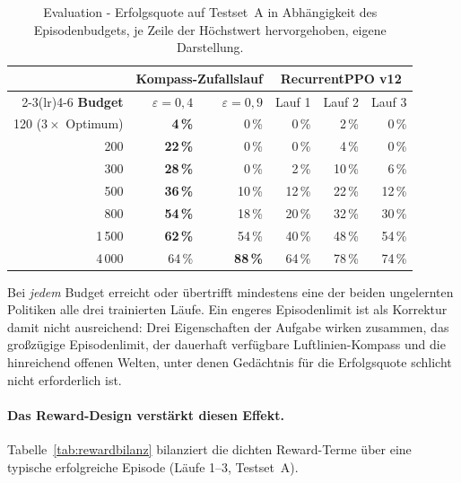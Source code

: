 \documentclass[11pt,a4paper]{article}
\begin{document}
\begin{table}[h]
\centering
\small
\begin{tabular}{@{}rrrrrr@{}}
\toprule
& \multicolumn{2}{c}{\textbf{Kompass-Zufallslauf}} & \multicolumn{3}{c}{\textbf{RecurrentPPO v12}} \\
\cmidrule(lr){2-3}\cmidrule(lr){4-6}
\textbf{Budget} & $\varepsilon = 0{,}4$ & $\varepsilon = 0{,}9$ & Lauf 1 & Lauf 2 & Lauf 3 \\
\midrule
120 ($3\times$ Optimum) & \textbf{4\,\%}  & 0\,\%  & 0\,\%  & 2\,\%  & 0\,\% \\
200                     & \textbf{22\,\%} & 0\,\%  & 0\,\%  & 4\,\%  & 0\,\% \\
300                     & \textbf{28\,\%} & 0\,\%  & 2\,\%  & 10\,\% & 6\,\% \\
500                     & \textbf{36\,\%} & 10\,\% & 12\,\% & 22\,\% & 12\,\% \\
800                     & \textbf{54\,\%} & 18\,\% & 20\,\% & 32\,\% & 30\,\% \\
1\,500                  & \textbf{62\,\%} & 54\,\% & 40\,\% & 48\,\% & 54\,\% \\
4\,000                  & 64\,\%          & \textbf{88\,\%} & 64\,\% & 78\,\% & 74\,\% \\
\bottomrule
\end{tabular}
\caption[Erfolgsquote als Funktion des Episodenbudgets]{Evaluation -
Erfolgsquote auf Testset~A in Abhängigkeit des Episodenbudgets, je Zeile der
Höchstwert hervorgehoben, eigene Darstellung.}
\label{tab:capsweep}
\end{table}

Bei \emph{jedem} Budget erreicht oder übertrifft mindestens eine der beiden
ungelernten Politiken alle drei trainierten Läufe. Ein engeres Episodenlimit
ist als Korrektur damit nicht ausreichend: Drei Eigenschaften der Aufgabe
wirken zusammen, das großzügige Episodenlimit, der dauerhaft verfügbare
Luftlinien-Kompass und die hinreichend offenen Welten, unter denen Gedächtnis
für die Erfolgsquote schlicht nicht erforderlich ist.

\paragraph{Das Reward-Design verstärkt diesen Effekt.} Tabelle~\ref{tab:rewardbilanz}
bilanziert die dichten Reward-Terme über eine typische erfolgreiche Episode
(Läufe 1--3, Testset~A).
\end{document}
